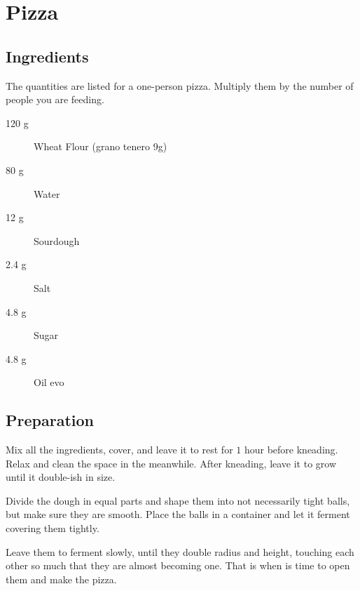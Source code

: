 \setchapterpreamble[u]{\margintoc}
\chapter{Pizza}

\section{Ingredients}
The quantities are listed for a one-person pizza. Multiply them by the number of people you are feeding.

\begin{multicols}{2}
\begin{description}
	\item[120 g] Wheat Flour (grano tenero 9g)
	\item[80 g] Water
	\item[12 g] Sourdough
	\item[2.4 g] Salt
	\item[4.8 g] Sugar
	\item[4.8 g] Oil \gls{evo}
\end{description}
\end{multicols}

\section{Preparation}
Mix all the ingredients, cover, and leave it to rest for $1$ hour before kneading.
%
Relax and clean the space in the meanwhile.
%
After kneading, leave it to grow until it double-ish in size.

Divide the dough in equal parts and shape them into not necessarily tight balls, but make sure they are smooth.
%
Place the balls in a container and  let it ferment covering them tightly.
%

Leave them to ferment slowly, until they double radius and height, touching each other so much that they are almost becoming one. That is when is time to open them and make the pizza.

